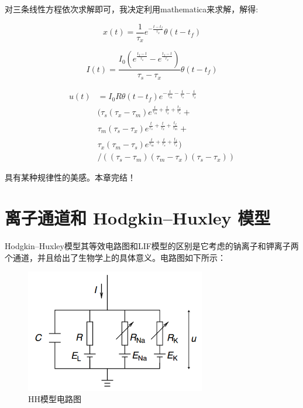 \documentclass[12pt, a4paper, oneside]{ctexbook}
\begin{document}
对三条线性方程依次求解即可，我决定利用mathematica来求解，解得:

\begin{equation}
    x(t)=\frac{1}{\tau_x}e^{-\frac{t-t_f}{\tau_x}}\theta(t-t_f)
\end{equation}

\begin{equation}
    I(t)=\frac{I_0(e^{\frac{t_f-t}{\tau_s}}-e^{\frac{t_f-t}{\tau_x}})}{\tau_s-\tau_x}\theta (t-t_f)
\end{equation}

\begin{equation}
    \begin{aligned}
        u(t)&=I_0 R \theta (t-t_f) e^{-\frac{t}{\tau_m}-\frac{t}{\tau_s}-\frac{t}{\tau_x}}\\
        &(\tau_s (\tau_x-\tau_m) e^{\frac{t}{\tau_m}+\frac{t}{\tau_x}+\frac{t_f}{\tau_s}}+\\
        &\tau_m (\tau_s-\tau_x) e^{\frac{t}{\tau_s}+\frac{t}{\tau_x}+\frac{t_f}{\tau_m}}+\\
        &\tau_x (\tau_m-\tau_s) e^{\frac{t}{\tau_m}+\frac{t}{\tau_s}+\frac{t_f}{\tau_x}})\\
        &/((\tau_s-\tau_m) (\tau_m-\tau_x) (\tau_s-\tau_x))
    \end{aligned}
\end{equation}

具有某种规律性的美感。本章完结！

\chapter{离子通道和 Hodgkin–Huxley 模型}

Hodgkin–Huxley模型其等效电路图和LIF模型的区别是它考虑的钠离子和钾离子两个通道，并且给出了生物学上的具体意义。电路图如下所示：

\begin{figure}[H]
    \centering
    \includegraphics[width=0.7\textwidth]{HH模型电路图.png}
    \caption{HH模型电路图}
\end{figure}
\end{document}
